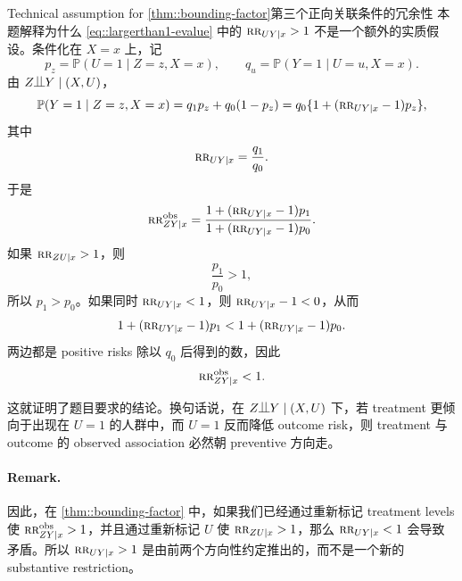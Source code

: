 \begin{exercisesolution}{Technical assumption for \cref{thm::bounding-factor}}{第三个正向关联条件的冗余性}
本题解释为什么 \cref{eq::largerthan1-evalue} 中的 $\textsc{rr}_{UY\mid x}>1$ 不是一个额外的实质假设。条件化在 $X=x$ 上，记
\[
p_z=\mathbb{P}(U=1\mid Z=z,X=x),\qquad
q_u=\mathbb{P}(Y=1\mid U=u,X=x).
\]
由 $Z\ind Y\mid (X,U)$，
\[
\mathbb{P}(Y=1\mid Z=z,X=x)
=q_1p_z+q_0(1-p_z)
=q_0\{1+(\textsc{rr}_{UY\mid x}-1)p_z\},
\]
其中
\[
\textsc{rr}_{UY\mid x}=\frac{q_1}{q_0}.
\]
于是
\[
\textsc{rr}_{ZY\mid x}^{\textup{obs}}
=
\frac{1+(\textsc{rr}_{UY\mid x}-1)p_1}
     {1+(\textsc{rr}_{UY\mid x}-1)p_0}.
\]
如果 $\textsc{rr}_{ZU\mid x}>1$，则
\[
\frac{p_1}{p_0}>1,
\]
所以 $p_1>p_0$。如果同时 $\textsc{rr}_{UY\mid x}<1$，则 $\textsc{rr}_{UY\mid x}-1<0$，从而
\[
1+(\textsc{rr}_{UY\mid x}-1)p_1
<
1+(\textsc{rr}_{UY\mid x}-1)p_0.
\]
两边都是 positive risks 除以 $q_0$ 后得到的数，因此
\[
\textsc{rr}_{ZY\mid x}^{\textup{obs}}<1.
\]

这就证明了题目要求的结论。换句话说，在 $Z\ind Y\mid (X,U)$ 下，若 treatment 更倾向于出现在 $U=1$ 的人群中，而 $U=1$ 反而降低 outcome risk，则 treatment 与 outcome 的 observed association 必然朝 preventive 方向走。

\paragraph{Remark.}
因此，在 \cref{thm::bounding-factor} 中，如果我们已经通过重新标记 treatment levels 使 $\textsc{rr}_{ZY\mid x}^{\textup{obs}}>1$，并且通过重新标记 $U$ 使 $\textsc{rr}_{ZU\mid x}>1$，那么 $\textsc{rr}_{UY\mid x}<1$ 会导致矛盾。所以 $\textsc{rr}_{UY\mid x}>1$ 是由前两个方向性约定推出的，而不是一个新的 substantive restriction。
\end{exercisesolution}

